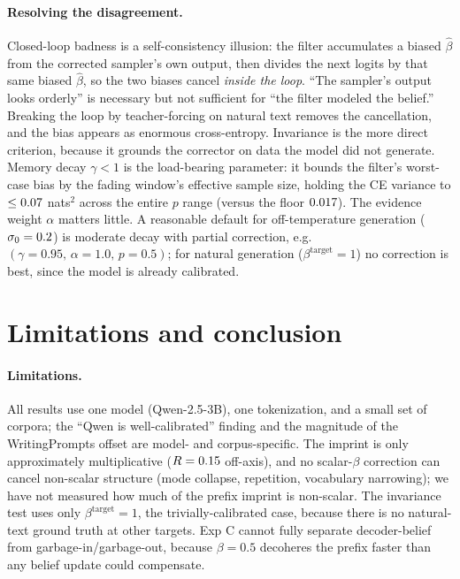 \documentclass[11pt]{article}
\begin{document}
\paragraph{Resolving the disagreement.} Closed-loop badness is a
self-consistency illusion: the filter accumulates a biased $\hat\beta$ from the
corrected sampler's own output, then divides the next logits by that same biased
$\hat\beta$, so the two biases cancel \emph{inside the loop}. ``The sampler's
output looks orderly'' is necessary but not sufficient for ``the filter modeled
the belief.'' Breaking the loop by teacher-forcing on natural text removes the
cancellation, and the bias appears as enormous cross-entropy. Invariance is the
more direct criterion, because it grounds the corrector on data the model did
not generate. Memory decay $\gamma<1$ is the load-bearing parameter: it bounds
the filter's worst-case bias by the fading window's effective sample size,
holding the CE variance to $\le0.07$ nats$^2$ across the entire $p$ range
(versus the floor $0.017$). The evidence weight $\alpha$ matters little.
A reasonable default for off-temperature generation
($\sigma_0=0.2$) is moderate decay with partial correction, e.g.\
$(\gamma=0.95,\,\alpha=1.0,\,p=0.5)$; for natural generation
($\beta^{\mathrm{target}}=1$) no correction is best, since the model is already
calibrated.

\section{Limitations and conclusion}\label{sec:limits}
\paragraph{Limitations.} All results use one model (Qwen-2.5-3B), one
tokenization, and a small set of corpora; the ``Qwen is well-calibrated''
finding and the magnitude of the WritingPrompts offset are model- and
corpus-specific. The imprint is only approximately multiplicative
($R=0.15$ off-axis), and no scalar-$\beta$ correction can cancel
non-scalar structure (mode collapse, repetition, vocabulary narrowing); we have
not measured how much of the prefix imprint is non-scalar. The invariance test
uses only $\beta^{\mathrm{target}}=1$, the trivially-calibrated case, because
there is no natural-text ground truth at other targets. Exp C cannot fully
separate decoder-belief from garbage-in/garbage-out, because $\beta=0.5$
decoheres the prefix faster than any belief update could compensate.
\end{document}
